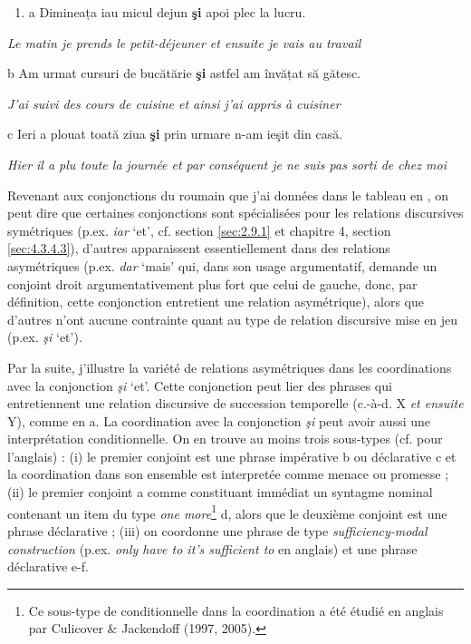 \begin{enumerate}
\item \label{bkm:Ref300787925}a  Dimineața iau micul dejun \textbf{şi} apoi plec la lucru.


\end{enumerate}
{\itshape
Le matin je prends le petit-déjeuner et ensuite je vais au travail}

  b  Am urmat cursuri de bucătărie \textbf{şi} astfel am învățat să gătesc. 

{\itshape
J'ai suivi des cours de cuisine et ainsi j'ai appris à cuisiner}

  c  Ieri a plouat toată ziua \textbf{şi} prin urmare n-am ieşit din casă.

{\itshape
Hier il a plu toute la journée et par conséquent je ne suis pas sorti de chez moi}

Revenant aux conjonctions du roumain que j'ai données dans le tableau en , on peut dire que certaines conjonctions sont spécialisées pour les relations discursives symétriques (p.ex. \textit{iar} `et', cf. section \ref{sec:2.9.1} et chapitre 4, section \ref{sec:4.3.4.3}), d'autres apparaissent essentiellement dans des relations asymétriques (p.ex. \textit{dar} `mais' qui, dans son usage argumentatif, demande un conjoint droit argumentativement plus fort que celui de gauche, donc, par définition, cette conjonction entretient une relation asymétrique), alors que d'autres n'ont aucune contrainte quant au type de relation discursive mise en jeu (p.ex. \textit{şi} `et'). 

Par la suite, j'illustre la variété de relations asymétriques dans les coordinations avec la conjonction \textit{şi} `et'. Cette conjonction peut lier des phrases qui entretiennent une relation discursive de succession temporelle (c.-à-d. X \textit{et ensuite} Y), comme en a. La coordination avec la conjonction \textit{şi} peut avoir aussi une interprétation conditionnelle. On en trouve au moins trois sous-types (cf. \citet{Franke2008} pour l'anglais) : (i) le premier conjoint est une phrase impérative b ou déclarative c et la coordination dans son ensemble est interpretée comme menace ou promesse ; (ii) le premier conjoint a comme constituant immédiat un syntagme nominal contenant un item du type \textit{one more}\footnote{Ce sous-type de conditionnelle dans la coordination a été étudié en anglais par Culicover \& Jackendoff (1997, 2005).} d, alors que le deuxième conjoint est une phrase déclarative ; (iii) on coordonne une phrase de type \textit{sufficiency-modal construction} (p.ex. \textit{only have to {\textbar} it's sufficient to} en anglais) et une phrase déclarative e-f. 


